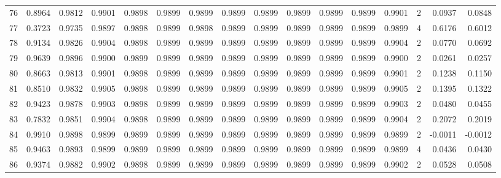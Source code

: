 \begin{tabular}{lrrrrrrrrrrrrrrr}
76  &      0.8964 &  0.9812 &  0.9901 &  0.9898 &  0.9899 &  0.9899 &  0.9899 &  0.9899 &  0.9899 &  0.9899 &   0.9899 &     0.9901 &      2 &                    0.0937 &                     0.0848 \\
77  &      0.3723 &  0.9735 &  0.9897 &  0.9898 &  0.9899 &  0.9898 &  0.9899 &  0.9899 &  0.9899 &  0.9899 &   0.9899 &     0.9899 &      4 &                    0.6176 &                     0.6012 \\
78  &      0.9134 &  0.9826 &  0.9904 &  0.9898 &  0.9899 &  0.9899 &  0.9899 &  0.9899 &  0.9899 &  0.9899 &   0.9899 &     0.9904 &      2 &                    0.0770 &                     0.0692 \\
79  &      0.9639 &  0.9896 &  0.9900 &  0.9899 &  0.9899 &  0.9899 &  0.9899 &  0.9899 &  0.9899 &  0.9899 &   0.9899 &     0.9900 &      2 &                    0.0261 &                     0.0257 \\
80  &      0.8663 &  0.9813 &  0.9901 &  0.9898 &  0.9899 &  0.9899 &  0.9899 &  0.9899 &  0.9899 &  0.9899 &   0.9899 &     0.9901 &      2 &                    0.1238 &                     0.1150 \\
81  &      0.8510 &  0.9832 &  0.9905 &  0.9898 &  0.9899 &  0.9899 &  0.9899 &  0.9899 &  0.9899 &  0.9899 &   0.9899 &     0.9905 &      2 &                    0.1395 &                     0.1322 \\
82  &      0.9423 &  0.9878 &  0.9903 &  0.9898 &  0.9899 &  0.9899 &  0.9899 &  0.9899 &  0.9899 &  0.9899 &   0.9899 &     0.9903 &      2 &                    0.0480 &                     0.0455 \\
83  &      0.7832 &  0.9851 &  0.9904 &  0.9898 &  0.9899 &  0.9899 &  0.9899 &  0.9899 &  0.9899 &  0.9899 &   0.9899 &     0.9904 &      2 &                    0.2072 &                     0.2019 \\
84  &      0.9910 &  0.9898 &  0.9899 &  0.9899 &  0.9899 &  0.9899 &  0.9899 &  0.9899 &  0.9899 &  0.9899 &   0.9899 &     0.9899 &      2 &                   -0.0011 &                    -0.0012 \\
85  &      0.9463 &  0.9893 &  0.9899 &  0.9899 &  0.9899 &  0.9899 &  0.9899 &  0.9899 &  0.9899 &  0.9899 &   0.9899 &     0.9899 &      4 &                    0.0436 &                     0.0430 \\
86  &      0.9374 &  0.9882 &  0.9902 &  0.9898 &  0.9899 &  0.9899 &  0.9899 &  0.9899 &  0.9899 &  0.9899 &   0.9899 &     0.9902 &      2 &                    0.0528 &                     0.0508 \\

\end{tabular}
